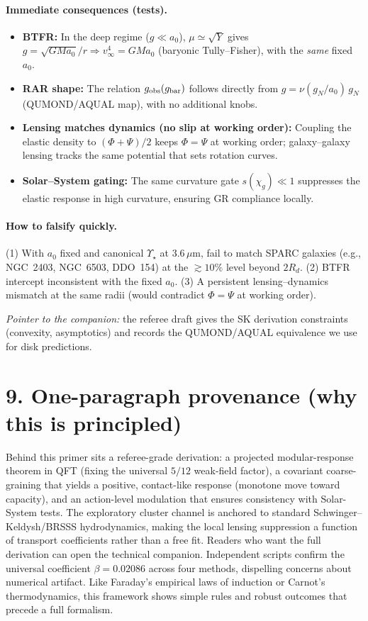 \documentclass[aps,prd,onecolumn,superscriptaddress,nofootinbib]{revtex4-2}
\begin{document}
\paragraph*{Immediate consequences (tests).}
\begin{itemize}
\item \textbf{BTFR:} In the deep regime (\(g\ll a_0\)), \(\mu\simeq \sqrt{Y}\) gives \(g=\sqrt{GMa_0}/r\Rightarrow v_\infty^4=GMa_0\) (baryonic Tully--Fisher), with the \emph{same} fixed \(a_0\).
\item \textbf{RAR shape:} The relation \(g_{\rm obs}(g_{\rm bar})\) follows directly from \(g=\nu(g_{\!N}/a_0)\,g_{\!N}\) (QUMOND/AQUAL map), with no additional knobs.
\item \textbf{Lensing matches dynamics (no slip at working order):} Coupling the elastic density to \((\Phi+\Psi)/2\) keeps \(\Phi=\Psi\) at working order; galaxy--galaxy lensing tracks the same potential that sets rotation curves.
\item \textbf{Solar--System gating:} The same curvature gate \(s(\chi_g)\ll 1\) suppresses the elastic response in high curvature, ensuring GR compliance locally.
\end{itemize}

\paragraph*{How to falsify quickly.}
(1) With \(a_0\) fixed and canonical \(\Upsilon_\star\) at 3.6\,\(\mu\)m, fail to match SPARC galaxies (e.g., NGC~2403, NGC~6503, DDO~154) at the \(\gtrsim 10\%\) level beyond \(2R_d\). (2) BTFR intercept inconsistent with the fixed \(a_0\). (3) A persistent lensing--dynamics mismatch at the same radii (would contradict \(\Phi=\Psi\) at working order).

\medskip
\noindent\emph{Pointer to the companion:} the referee draft gives the SK derivation constraints (convexity, asymptotics) and records the QUMOND/AQUAL equivalence we use for disk predictions.

\section*{9. One-paragraph provenance (why this is principled)}
Behind this primer sits a referee-grade derivation: a projected modular-response theorem in QFT (fixing the universal $5/12$ weak-field factor), a covariant coarse-graining that yields a positive, contact-like response (monotone move toward capacity), and an action-level modulation that ensures consistency with Solar-System tests. The exploratory cluster channel is anchored to standard Schwinger--Keldysh/BRSSS hydrodynamics, making the local lensing suppression a function of transport coefficients rather than a free fit. Readers who want the full derivation can open the technical companion. Independent scripts confirm the universal coefficient $\beta = 0.02086$ across four methods, dispelling concerns about numerical artifact. Like Faraday's empirical laws of induction or Carnot's thermodynamics, this framework shows simple rules and robust outcomes that precede a full formalism.
\end{document}
